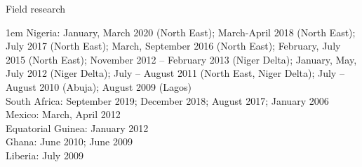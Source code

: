 \documentclass[10.9pt]{article}
\makeatletter
\newcommand\donotbreakhere{\par\nobreak\@afterheading\vspace{1em}}
\newcommand{\years}[1]{\marginnote{\scriptsize #1}}
\newenvironment{indnt}{\begin{adjustwidth}{1em}{}}{\end{adjustwidth}}
\makeatother
\begin{document}

{\large Field research} \donotbreakhere
\begin{indnt}
Nigeria: January, March 2020 (North East); March-April 2018 (North East); July 2017 (North East); March, September 2016 (North East); February, July 2015 (North East); November 2012 -- February 2013 (Niger Delta); January, May, July 2012 (Niger Delta); July -- August 2011 (North East, Niger Delta); July -- August 2010 (Abuja); August 2009 (Lagos) \\[.75em]
South Africa: September 2019; December 2018; August 2017; January 2006\\[.75em]
Mexico: March, April 2012 \\[.75em]
Equatorial Guinea: January 2012  \\[.75em]
Ghana: June 2010; June 2009 \\[.75em]
Liberia: July 2009
\end{indnt}
\vspace{1.5em}
\end{document}
